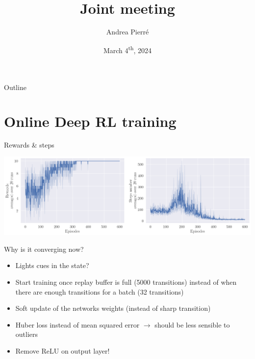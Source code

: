 \documentclass[bigger]{beamer}
\author{Andrea Pierré}
\date{March 4\textsuperscript{th}, 2024}
\title{Joint meeting}
\institute{Brown University}
\begin{document}
\maketitle
\begin{frame}[plain]{Outline}
\tableofcontents
\end{frame}

\section{Online Deep RL training}
\label{sec:org369ea0a}
\begin{frame}[label={sec:org562be35}]{Rewards \& steps}
\begin{center}
\includegraphics[width=\linewidth]{img/steps-and-rewards.png}
\end{center}
\end{frame}
\begin{frame}[<+->][label={sec:org0626cd8}]{Why is it converging now?}
\begin{itemize}
\item Lights cues in the state?
\item Start training once replay buffer is full (5000 transitions) instead of when there are enough transitions for a batch (32 transitions)
\item Soft update of the networks weights (instead of sharp transition)
\item Huber loss instead of mean squared error \(\to\) should be less sensible to outliers
\item \alert{Remove ReLU on output layer!}
\end{itemize}
\end{frame}
\end{document}
